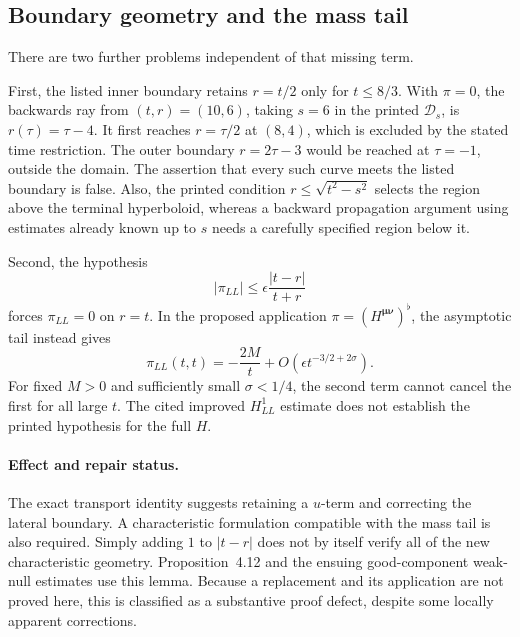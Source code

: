 \documentclass[10pt]{article}
\begin{document}
\subsection*{Boundary geometry and the mass tail}
There are two further problems independent of that missing term.\par
First, the listed inner boundary retains \(r=t/2\) only for \(t\leq8/3\). With \(\pi=0\), the backwards ray from \((t,r)=(10,6)\), taking \(s=6\) in the printed \(\mathcal D_s\), is \(r(\tau)=\tau-4\). It first reaches \(r=\tau/2\) at \((8,4)\), which is excluded by the stated time restriction. The outer boundary \(r=2\tau-3\) would be reached at \(\tau=-1\), outside the domain. The assertion that every such curve meets the listed boundary is false. Also, the printed condition \(r\leq\sqrt{t^2-s^2}\) selects the region above the terminal hyperboloid, whereas a backward propagation argument using estimates already known up to \(s\) needs a carefully specified region below it.\par
Second, the hypothesis \[|\pi_{LL}|\leq \epsilon\frac{|t-r|}{t+r}\] forces \(\pi_{LL}=0\) on \(r=t\). In the proposed application \(\pi=(H^{\boldsymbol\mu\boldsymbol\nu})^\flat\), the asymptotic tail instead gives \[\pi_{LL}(t,t)=-\frac{2M}{t}
       +O(\epsilon t^{-3/2+2\sigma}).\] For fixed \(M>0\) and sufficiently small \(\sigma<1/4\), the second term cannot cancel the first for all large \(t\). The cited improved \(H^1_{LL}\) estimate does not establish the printed hypothesis for the full \(H\).\par
\paragraph*{Effect and repair status.}\mbox{}\par
The exact transport identity suggests retaining a \(u\)-term and correcting the lateral boundary. A characteristic formulation compatible with the mass tail is also required. Simply adding \(1\) to \(|t-r|\) does not by itself verify all of the new characteristic geometry. Proposition 4.12 and the ensuing good-component weak-null estimates use this lemma. Because a replacement and its application are not proved here, this is classified as a substantive proof defect, despite some locally apparent corrections.\par
\end{document}
